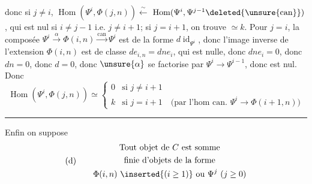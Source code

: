 \unsure{$\forall\alpha\in$}
donc si $j\neq i$, $\operatorname{Hom}(\Psi^i,\Phi(j,n))\xleftarrow{\sim}$
$\operatorname{Hom}(\Psi^i,\Psi^{j-1}\deleted{\unsure{\mathrm{can}}})$,
qui est nul si
$i\neq j-1$ i.e. $j\neq i+1$; si $j=i+1$, on trouve $\simeq k$.
Pour $j=i$, la composée
$\Psi^i\xrightarrow{\alpha}\Phi(i,n)\xrightarrow{\mathrm{can}}\Psi^i$
est de la forme
$d\operatorname{id}_{\Psi^i}$, donc l'image
inverse de l'extension
$\Phi(i,n)$ est de classe $d e_{i,n}=dn e_i$,
qui est nulle, donc $dn e_i=0$, donc
$dn=0$, donc $d=0$, donc $\unsure{\alpha}$ se factorise
par $\Psi^i\longrightarrow\Psi^{i-1}$, donc est nul.
Donc
\[
\operatorname{Hom}(\Psi^i,\Phi(j,n))\simeq
\left\{\begin{array}{ll}
0&\text{si }j\neq i+1\\
k&\text{si }j=i+1\quad\text{(par l'hom can. }\Psi^i\longrightarrow\Phi(i+1,n)\text{)}
\end{array}\right.
\]
\par\bigskip\hrule\bigskip
Enfin on suppose
\[
\text{(d)}\qquad\begin{gathered}
\text{Tout objet de }C\text{ est somme}\\
\text{finie d'objets de la forme}\\
\Phi(i,n)\ \inserted{(i\geq1)}\text{ ou }\Psi^j\ (j\geq0)
\end{gathered}
\]

